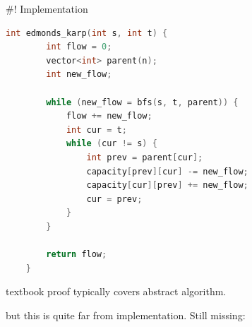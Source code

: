 \documentclass[fleqn]{beamer}
\begin{document}
  \hfill
  \hfill
  \hfill
  \hfill
  \hfill
  \hfill{}


#! Implementation
  \begin{minipage}{.49\textwidth}
  \footnotesize
  \algoEdka
  \end{minipage}%
  \begin{minipage}{.49\textwidth}
  \tiny
  \begin{lstlisting}[language=C++]
    int edmonds_karp(int s, int t) {
        int flow = 0;
        vector<int> parent(n);
        int new_flow;

        while (new_flow = bfs(s, t, parent)) {
            flow += new_flow;
            int cur = t;
            while (cur != s) {
                int prev = parent[cur];
                capacity[prev][cur] -= new_flow;
                capacity[cur][prev] += new_flow;
                cur = prev;
            }
        }

        return flow;
    }
    \end{lstlisting}
  \end{minipage}



  \onslide<+->
  textbook proof typically covers abstract algorithm.

  \onslide<+->
  but this is quite far from implementation. Still missing:
\end{document}
